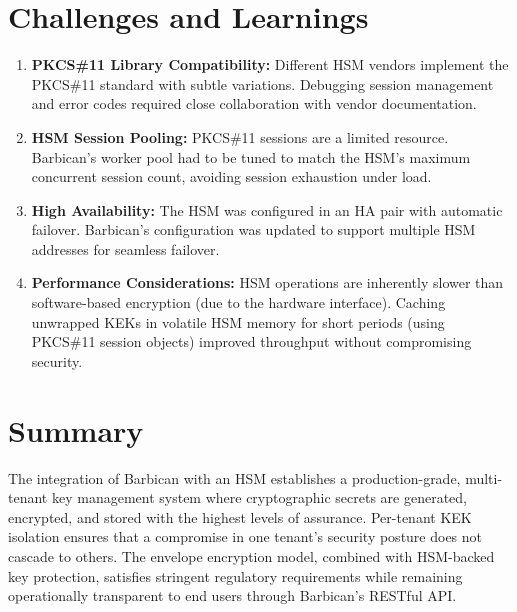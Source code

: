 \documentclass[12pt,a4paper,oneside]{report}
\begin{document}
\section{Challenges and Learnings}

\begin{enumerate}
    \item \textbf{PKCS\#11 Library Compatibility:} Different HSM vendors implement the PKCS\#11 standard with subtle variations. Debugging session management and error codes required close collaboration with vendor documentation.
    \item \textbf{HSM Session Pooling:} PKCS\#11 sessions are a limited resource. Barbican's worker pool had to be tuned to match the HSM's maximum concurrent session count, avoiding session exhaustion under load.
    \item \textbf{High Availability:} The HSM was configured in an HA pair with automatic failover. Barbican's configuration was updated to support multiple HSM addresses for seamless failover.
    \item \textbf{Performance Considerations:} HSM operations are inherently slower than software-based encryption (due to the hardware interface). Caching unwrapped KEKs in volatile HSM memory for short periods (using PKCS\#11 session objects) improved throughput without compromising security.
\end{enumerate}

\section{Summary}

The integration of Barbican with an HSM establishes a production-grade, multi-tenant key management system where cryptographic secrets are generated, encrypted, and stored with the highest levels of assurance. Per-tenant KEK isolation ensures that a compromise in one tenant's security posture does not cascade to others. The envelope encryption model, combined with HSM-backed key protection, satisfies stringent regulatory requirements while remaining operationally transparent to end users through Barbican's RESTful API.


\end{document}

